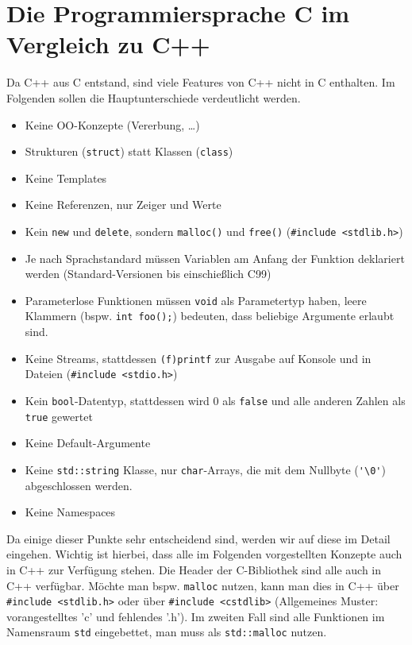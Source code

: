 \section{\ExercisePrefixEmbeddedC Die Programmiersprache C im Vergleich zu C++}
\label{sec:CVersusCPlusPlus}

Da C++ aus C entstand, sind viele Features von C++ nicht in C enthalten.
Im Folgenden sollen die Hauptunterschiede verdeutlicht werden.

\begin{itemize}
	\item Keine OO-Konzepte (Vererbung, \dots)
    \item Strukturen (\lstinline{struct}) statt Klassen (\lstinline{class})
	\item Keine Templates
	\item Keine Referenzen, nur Zeiger und Werte
	\item Kein \lstinline{new} und \lstinline{delete}, sondern \lstinline{malloc()} und \lstinline{free()} (\lstinline|#include <stdlib.h>|)
	\item Je nach Sprachstandard müssen Variablen am Anfang der Funktion deklariert werden (Standard-Versionen bis einschießlich C99)
	\item Parameterlose Funktionen müssen \lstinline{void} als Parametertyp haben, leere Klammern (bspw. \lstinline{int foo();}) bedeuten, dass beliebige Argumente erlaubt sind.
	\item Keine Streams, stattdessen \lstinline{(f)printf} zur Ausgabe auf Konsole und in Dateien (\verb|#include <stdio.h>|)
	\item Kein \lstinline{bool}-Datentyp, stattdessen wird 0 als \lstinline{false} und alle anderen Zahlen als \lstinline{true} gewertet
	\item Keine Default-Argumente
	\item Keine \lstinline{std::string} Klasse, nur \lstinline{char}-Arrays, die mit dem Nullbyte (\lstinline{'\0'}) abgeschlossen werden.
	\item Keine Namespaces
\end{itemize}

Da einige dieser Punkte sehr entscheidend sind, werden wir auf diese im Detail eingehen.
Wichtig ist hierbei, dass alle im Folgenden vorgestellten Konzepte auch in C++ zur Verfügung stehen.
Die Header der C-Bibliothek sind alle auch in C++ verfügbar.
Möchte man bspw. \lstinline{malloc} nutzen, kann man dies in C++ über \lstinline|#include <stdlib.h>| oder über \lstinline{#include <cstdlib>} (Allgemeines Muster: vorangestelltes 'c' und fehlendes '.h').
Im zweiten Fall sind alle Funktionen im Namensraum \lstinline{std} eingebettet, man muss als \lstinline{std::malloc} nutzen.

